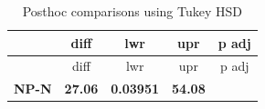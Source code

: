 \documentclass[]{article}
\begin{document}
\begin{longtable}[]{@{}ccccc@{}}
\caption{Posthoc comparisons using Tukey HSD}\tabularnewline
\toprule
\begin{minipage}[b]{0.13\columnwidth}\centering\strut
~
\strut\end{minipage} &
\begin{minipage}[b]{0.13\columnwidth}\centering\strut
diff
\strut\end{minipage} &
\begin{minipage}[b]{0.14\columnwidth}\centering\strut
lwr
\strut\end{minipage} &
\begin{minipage}[b]{0.13\columnwidth}\centering\strut
upr
\strut\end{minipage} &
\begin{minipage}[b]{0.16\columnwidth}\centering\strut
p adj
\strut\end{minipage}\tabularnewline
\midrule
\endfirsthead
\toprule
\begin{minipage}[b]{0.13\columnwidth}\centering\strut
~
\strut\end{minipage} &
\begin{minipage}[b]{0.13\columnwidth}\centering\strut
diff
\strut\end{minipage} &
\begin{minipage}[b]{0.14\columnwidth}\centering\strut
lwr
\strut\end{minipage} &
\begin{minipage}[b]{0.13\columnwidth}\centering\strut
upr
\strut\end{minipage} &
\begin{minipage}[b]{0.16\columnwidth}\centering\strut
p adj
\strut\end{minipage}\tabularnewline
\midrule
\endhead
\begin{minipage}[t]{0.13\columnwidth}\centering\strut
\textbf{NP-N}
\strut\end{minipage} &
\begin{minipage}[t]{0.13\columnwidth}\centering\strut
\textbf{27.06}
\strut\end{minipage} &
\begin{minipage}[t]{0.14\columnwidth}\centering\strut
\textbf{0.03951}
\strut\end{minipage} &
\begin{minipage}[t]{0.13\columnwidth}\centering\strut
\textbf{54.08}
\strut\end{minipage} &
\begin{minipage}[t]{0.16\columnwidth}\centering\strut

\end{minipage}
\end{longtable}
\end{document}
